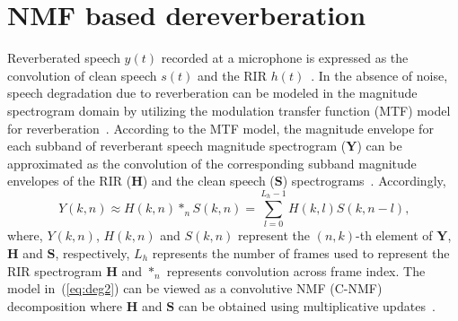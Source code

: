 

\section{NMF based dereverberation}

Reverberated speech $y(t)$ recorded at a microphone is expressed as the convolution of clean speech $s(t)$ and the RIR $h(t)$~\cite{naylor2010speech}. %
In the absence of noise, speech degradation due to reverberation can be modeled in the magnitude spectrogram domain by utilizing the modulation transfer function (MTF) model for reverberation~\cite{kameoka2009robust}. According to the MTF  model, the magnitude envelope for each subband of reverberant speech magnitude spectrogram ($\mathbf{Y}$) can be approximated as the convolution of the corresponding subband magnitude envelopes of the RIR ($\mathbf{H}$) and the clean speech ($\mathbf{S}$) spectrograms~\cite{Kumar2011}. Accordingly, 
\begin{equation}
Y(k,n) \approx H(k,n)*_n S(k,n)=\sum_{l=0}^{L_h-1}H(k,l)S(k,n-l)\text{,}
\label{eq:deg2}
\end{equation}
where, $Y(k,n)$, $H(k,n)$ and $S(k,n)$ represent the $(n,k)$-th element of $\mathbf{Y}$, $\mathbf{H}$ and $\mathbf{S}$, respectively, $L_h$ represents the number of frames used to represent the RIR spectrogram $\mathbf{H}$ and $*_n$ represents convolution across frame index. The model in~(\ref{eq:deg2}) can be viewed as a convolutive NMF (C-NMF) decomposition where $\mathbf{H}$ and $\mathbf{S}$ can be obtained using multiplicative updates~\cite{kameoka2009robust}.

